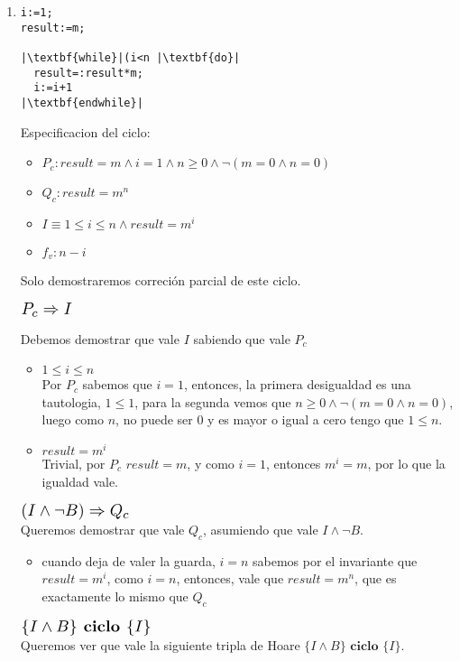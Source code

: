 \documentclass{article}
\begin{document}
\noindent
\begin{enumerate}[label=\alph*)]
	\item 

\begin{lstlisting}
i:=1;
result:=m;

|\textbf{while}|(i<n |\textbf{do}|
  result=:result*m;
  i:=i+1
|\textbf{endwhile}|
\end{lstlisting}

 Especificacion del ciclo:
	\begin{itemize}
		\item $P_c: result=m \wedge i=1\wedge n\geq 0 \wedge \neg(m=0\wedge n=0)$
		\item $Q_c:result=m^n$
		\item $I\equiv 1\leq i\leq n \wedge result=m^i$
		\item $f_v:n-i$
	\end{itemize}
	Solo demostraremos correción parcial de este ciclo.
	\begin{flushleft}$\scalebox{1.3}{$P_c\Rightarrow I$}$\end{flushleft}
	Debemos demostrar que vale $I$ sabiendo que vale $P_c$ 
	\begin{itemize}
		\item $ 1\leq i\leq n$\smallskip \\
		Por $P_c$ sabemos que $i=1$, entonces, la primera desigualdad es una tautologia,
		$1\leq 1$, para la segunda vemos que $n\geq0\wedge \neg(m=0 \wedge n=0)$, luego como 
		$n$, no puede ser 0 y es mayor o igual a cero tengo que $1\leq n$.
		\item  $result=m^i$\\
		Trivial, por $P_c$ $result=m$, y como $i=1$, entonces $m^i=m$, por lo que 
		 la igualdad vale.  
	\end{itemize}	 
	$\scalebox{1.3}{$(I\wedge \neg B)\Rightarrow Q_c$}$\smallskip \\
	Queremos demostrar que vale $Q_c$, asumiendo que vale  $I\wedge \neg B$.
	\begin{itemize}
	\item cuando deja de valer la guarda, $i=n$ sabemos por el invariante que $result=m^i$, como $i=n$, entonces,
	vale que $result=m^n$, que es exactamente lo mismo que $Q_c$
	\end{itemize}
	$\scalebox{1.3}{$\{I\wedge B\} \textbf{ ciclo } \{I\}$}$\medskip \\
	Queremos ver que vale la siguiente tripla de Hoare $\{I\wedge B\} \textbf{ ciclo } \{I\}$.\\

\end{enumerate}
\end{document}

